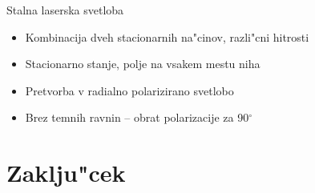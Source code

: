 \documentclass{beamer}
\begin{document}
\begin{frame}{Stalna laserska svetloba}
 \begin{itemize}
  \item Kombinacija dveh stacionarnih na"cinov, razli"cni hitrosti
  \item Stacionarno stanje, polje na vsakem mestu niha
  \item Pretvorba v radialno polarizirano svetlobo
  \item Brez temnih ravnin -- obrat polarizacije za 90$^{\circ}$
 \end{itemize}
 
 \begin{figure}[h]
 \centering
     \hspace{.3cm}
    \raisebox{.13\textwidth}{\Huge $\boldsymbol\neq$} \hspace{.2cm}

    
 \end{figure}
  
\end{frame}

\section{Zaklju"cek}
\end{document}
